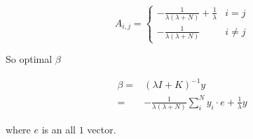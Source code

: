 \documentclass[fleqn,a4paper,12pt]{article}
\begin{document}
\[A_{i,j}  = 
\begin{cases}
  - \frac{1}{\lambda (\lambda + N)} + \frac{1}{\lambda} & i = j \\
  - \frac{1}{\lambda (\lambda + N)} & i \ne j
\end{cases}
\]


So optimal $\beta$

\begin{align*}
  \beta
  =& (\lambda I + K)^{-1} y \\
  =& -\frac{1}{\lambda(\lambda + N)} \sum_i^N y_i \cdot e + \frac{1}{\lambda} y
\end{align*}

where $e$ is an all $1$ vector.
\end{document}
